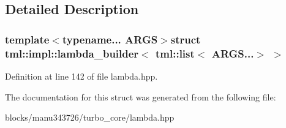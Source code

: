 \subsection{Detailed Description}
\subsubsection*{template$<$typename... A\+R\+G\+S$>$struct tml\+::impl\+::lambda\+\_\+builder$<$ tml\+::list$<$ A\+R\+G\+S...$>$ $>$}



Definition at line 142 of file lambda.\+hpp.



The documentation for this struct was generated from the following file\+:\begin{DoxyCompactItemize}
\item 
blocks/manu343726/turbo\+\_\+core/lambda.\+hpp\end{DoxyCompactItemize}
